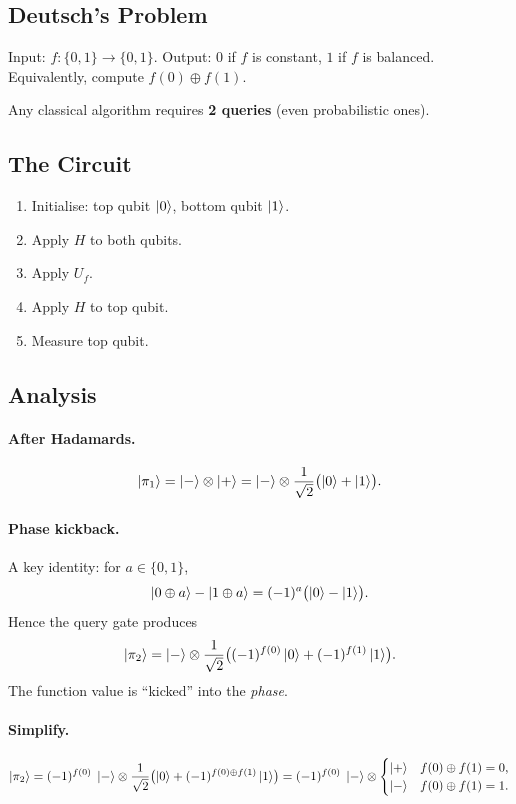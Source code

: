 \documentclass[11pt]{article}
\theoremstyle{definition}
\begin{document}
\subsection{Deutsch's Problem}

Input: $f:\{0,1\}\to\{0,1\}$.  Output: $0$ if $f$ is constant, $1$ if $f$ is balanced.  Equivalently, compute $f(0)\oplus f(1)$.

Any classical algorithm requires \textbf{2 queries} (even probabilistic ones).

\subsection{The Circuit}

\begin{enumerate}
    \item Initialise: top qubit $\ket{0}$, bottom qubit $\ket{1}$.
    \item Apply $H$ to both qubits.
    \item Apply $U_f$.
    \item Apply $H$ to top qubit.
    \item Measure top qubit.
\end{enumerate}

\subsection{Analysis}

\paragraph{After Hadamards.}
\[
    \ket{\pi_1} = \ket{-}\otimes\ket{+}
    = \ket{-}\otimes\frac{1}{\sqrt{2}}\bigl(\ket{0}+\ket{1}\bigr).
\]

\paragraph{Phase kickback.}  A key identity: for $a\in\{0,1\}$,
\[
    \ket{0\oplus a}-\ket{1\oplus a} = (-1)^a\bigl(\ket{0}-\ket{1}\bigr).
\]
Hence the query gate produces
\[
    \ket{\pi_2}
    = \ket{-}\otimes\frac{1}{\sqrt{2}}\bigl((-1)^{f(0)}\ket{0}+(-1)^{f(1)}\ket{1}\bigr).
\]
The function value is ``kicked'' into the \emph{phase}.

\paragraph{Simplify.}
\[
    \ket{\pi_2}
    = (-1)^{f(0)}\;\ket{-}\otimes\frac{1}{\sqrt{2}}\bigl(\ket{0}+(-1)^{f(0)\oplus f(1)}\ket{1}\bigr)
    = (-1)^{f(0)}\;\ket{-}\otimes
    \begin{cases}\ket{+} & f(0)\oplus f(1)=0,\\ \ket{-} & f(0)\oplus f(1)=1.\end{cases}
\]
\end{document}
